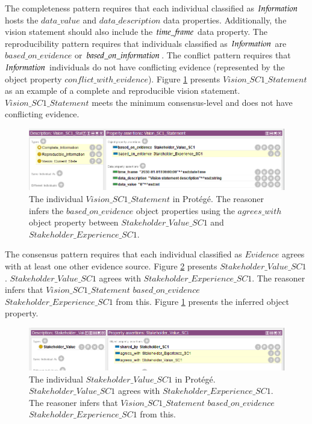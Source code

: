 The completeness pattern requires that each individual classified as $In{\mkern-2mu f\mkern-3mu}ormation$ hosts the $data\_value$ and $data\_description$ data properties. Additionally, the vision statement should also include the $time\_{\mkern-2mu f\mkern-3mu}rame$ data property. The reproducibility pattern requires that individuals classified as $In{\mkern-2mu f\mkern-3mu}ormation$ are $based\_on\_evidence$ or $based\_on\_in{\mkern-2mu f\mkern-3mu}ormation$. The conflict pattern requires that $In{\mkern-2mu f\mkern-3mu}ormation$ individuals do not have conflicting evidence (represented by the object property $conflict\_with\_evidence$). Figure \ref{fig:RP_Vision_SC1_Statement} presents $Vision\_SC1\_Statement$ as an example of a complete and reproducible vision statement. $Vision\_SC1\_Statement$ meets the minimum consensus-level and does not have conflicting evidence.

\begin{figure}[H]
\centering
  \includegraphics[width=17cm]{../../Images/05_Validation/05_RP_SC1_Vision_SC1_Statement.png}
  \caption{The individual $Vision\_SC1\_Statement$ in Prot\'eg\'e. The reasoner infers the $based\_on\_evidence$ object properties using the $agrees\_with$ object property between $Stakeholder\_Value\_SC1$ and $Stakeholder\_Experience\_SC1$.}
  \label{fig:RP_Vision_SC1_Statement}
\end{figure}

The consensus pattern requires that each individual classified as $Evidence$ agrees with at least one other evidence source. Figure \ref{fig:RP_Stakeholder_Value_SC1} presents $Stakeholder\_Value\_SC1$. $Stakeholder\_Value\_SC1$ agrees with $Stakeholder\_Experience\_SC1$. The reasoner infers that $Vision\_SC1\_Statement$ $based\_on\_evidence$ $Stakeholder\_Experience\_SC1$ from this. Figure \ref{fig:RP_Vision_SC1_Statement} presents the inferred object property.

\begin{figure}[H]
\centering
  \includegraphics[width=17cm]{../../Images/05_Validation/05_RP_SC1_Stakeholder_Value_SC1.png}
  \caption{The individual $Stakeholder\_Value\_SC1$ in Prot\'eg\'e. $Stakeholder\_Value\_SC1$ agrees with $Stakeholder\_Experience\_SC1$. The reasoner infers that $Vision\_SC1\_Statement$ $based\_on\_evidence$ $Stakeholder\_Experience\_SC1$ from this.}
  \label{fig:RP_Stakeholder_Value_SC1}
\end{figure}

